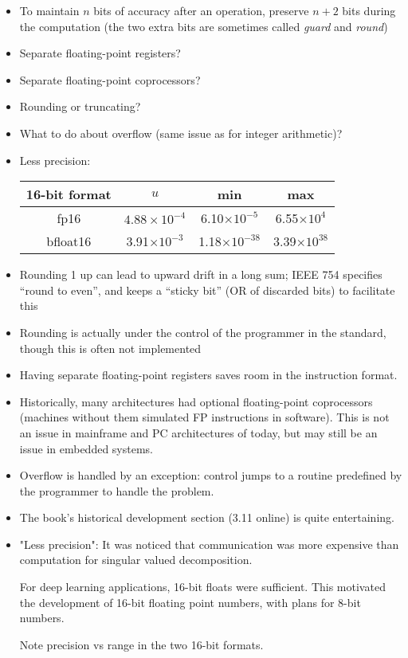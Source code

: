\begin{frame}[fragile]
\begin{itemize}
\item To maintain $n$ bits of accuracy after an operation, preserve $n+2$
  bits during the computation (the two extra bits are sometimes 
  called {\em guard} and {\em round})
\item Separate floating-point registers? 
\item Separate floating-point coprocessors?
\item Rounding or truncating?
\item What to do about overflow (same issue as for integer arithmetic)?
\item Less precision:
	
	\begin{center}
		\begin{tabular}{cccc}
			 16-bit format & $u$ & min & max \\\hline
			 fp16 & $4.88\times 10^{-4}$ & 6.10$\times 10^{-5}$ & 6.55$\times 10^{4}$\\
			 bfloat16 & 3.91$\times 10^{-3}$ & 1.18$\times 10^{-38}$ & 3.39$\times10^{38}$
		\end{tabular}
	\end{center}
\end{itemize}
\BNotes\ifnum{}
\begin{itemize}
\item Rounding 1 up can lead to upward drift in a long sum; IEEE 754
  specifies ``round to even'', and keeps a ``sticky bit'' (OR of
  discarded bits) to facilitate this
\item Rounding is actually under the control of the programmer in the
  standard, though this is often not implemented
\item Having separate floating-point registers saves room in the
instruction format.
\item Historically, many architectures had optional
floating-point coprocessors (machines without them simulated FP
instructions in software). This is not an issue in mainframe and PC
architectures of today, but may still be an issue in embedded systems.
\item Overflow is handled by an exception: control jumps to a routine
predefined by the programmer to handle the problem. 
\item The book's historical development section (3.11 online)
      is quite entertaining. 
\item "Less precision": It was noticed that communication was more
	expensive than computation for singular valued decomposition.  

	For deep learning applications, 16-bit floats were sufficient.
	This motivated the development of 16-bit floating point numbers,
	with plans for 8-bit numbers.

	Note precision vs range in the two 16-bit formats.
\end{itemize}
\fi\ENotes
\end{frame}

